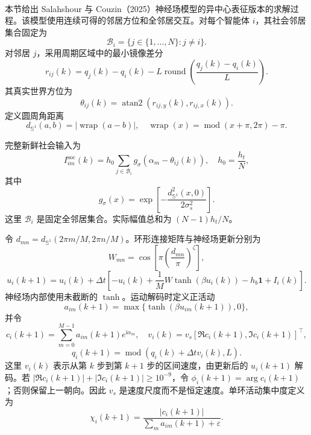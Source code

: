 \documentclass[UTF8,fontset=windows,11pt]{ctexart}
\newcommand{\upcite}[1]{\textsuperscript{\cite{#1}}}
\begin{document}
本节给出 Salahshour 与 Couzin（2025）神经场模型的异中心表征版本\upcite{Salahshour2025}的求解过程。该模型使用连续可得的邻居方位和全邻居交互。对每个智能体 $i$，其社会邻居集合固定为
\begin{equation}
 \mathcal B_i=\{j\in\{1,\ldots,N\}:j\ne i\}.
\end{equation}
对邻居 $j$，采用周期区域中的最小镜像差分
\begin{equation}
 r_{ij}(k)=q_j(k)-q_i(k)-L\operatorname{round}\left(\frac{q_j(k)-q_i(k)}{L}\right).
\end{equation}
其真实世界方位为
\begin{equation}
 \theta_{ij}(k)=\operatorname{atan2}(r_{ij,y}(k),r_{ij,x}(k)).
\end{equation}
定义圆周角距离
\begin{equation}
 d_{\mathbb S^1}(a,b)=\left|\operatorname{wrap}(a-b)\right|,
\quad \operatorname{wrap}(x)=\operatorname{mod}(x+\pi,2\pi)-\pi.
\end{equation}

完整新鲜社会输入为
\begin{equation}
 I^{\mathrm{soc}}_{im}(k)=h_0\sum_{j\in\mathcal B_i}
 g_\sigma\left(\alpha_m-\theta_{ij}(k)\right),
 \quad h_0=\frac{h_t}{N},
\end{equation}
其中
\begin{equation}
 g_\sigma(x)=\exp\left[-\frac{d_{\mathbb S^1}^2(x,0)}{2\sigma_s^2}\right].
\end{equation}
这里 $\mathcal B_i$ 是固定全邻居集合。实际幅值总和为 $(N-1)h_t/N$。

令 $d_{mn}=d_{\mathbb S^1}(2\pi m/M,2\pi n/M)$。环形连接矩阵与神经场更新分别为
\begin{equation}
 W_{mn}=\cos\left[\pi\left(\frac{d_{mn}}{\pi}\right)^\zeta\right],
\end{equation}
\begin{equation}
 u_i(k+1)=u_i(k)+\Delta t\left[-u_i(k)+\frac{1}{M}W\tanh(\beta u_i(k))-h_b\bm 1+I_i(k)\right].
\end{equation}
神经场内部使用未截断的 $\tanh$。运动解码时定义正活动
\begin{equation}
 a_{im}(k+1)=\max\{\tanh(\beta u_{im}(k+1)),0\},
\end{equation}
并令
\begin{equation}
 c_i(k+1)=\sum_{m=0}^{M-1}a_{im}(k+1)e^{\mathrm i\alpha_m},
\quad
 v_i(k)=v_s[\Re c_i(k+1),\Im c_i(k+1)]^\top,
\end{equation}
\begin{equation}
 q_i(k+1)=\operatorname{mod}(q_i(k)+\Delta t v_i(k),L).
\end{equation}
这里 $v_i(k)$ 表示从第 $k$ 步到第 $k+1$ 步的区间速度，由更新后的 $u_i(k+1)$ 解码。若 $|\Re c_i(k+1)|+|\Im c_i(k+1)|\ge10^{-9}$，令 $\phi_i(k+1)=\arg c_i(k+1)$；否则保留上一朝向。因此 $v_s$ 是速度尺度而不是恒定速度。单环活动集中度定义为
\begin{equation}
 \chi_i(k+1)=\frac{|c_i(k+1)|}{\sum_m a_{im}(k+1)+\varepsilon}.
\end{equation}
\end{document}
